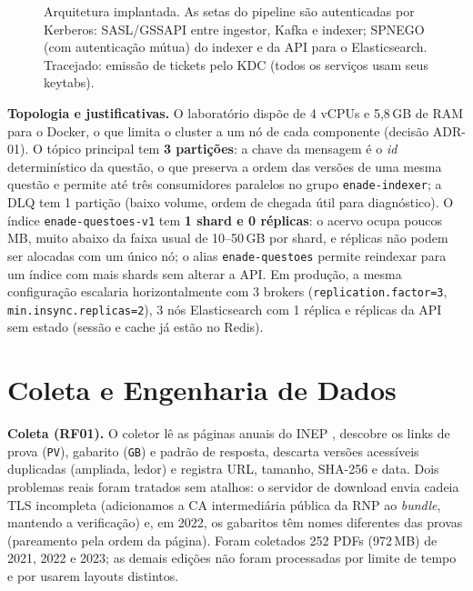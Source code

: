 \documentclass[12pt]{article}
\newcommand{\cod}[1]{\texttt{\small #1}}
\begin{document}
\begin{figure}[ht]
{}
\caption{Arquitetura implantada. As setas do pipeline são autenticadas por Kerberos: SASL/GSSAPI entre ingestor, Kafka e indexer; SPNEGO (com autenticação mútua) do indexer e da API para o Elasticsearch. Tracejado: emissão de tickets pelo KDC (todos os serviços usam seus keytabs).}
\label{fig:arq}
\end{figure}

\textbf{Topologia e justificativas.} O laboratório dispõe de 4 vCPUs e 5,8\,GB de RAM para o Docker, o que
limita o cluster a um nó de cada componente (decisão ADR-01). O tópico principal tem \textbf{3 partições}: a
chave da mensagem é o \textit{id} determinístico da questão, o que preserva a ordem das versões de uma mesma
questão e permite até três consumidores paralelos no grupo \cod{enade-indexer}; a DLQ tem 1 partição (baixo
volume, ordem de chegada útil para diagnóstico). O índice \cod{enade-questoes-v1} tem \textbf{1 shard e 0
réplicas}: o acervo ocupa poucos MB, muito abaixo da faixa usual de 10--50\,GB por shard, e réplicas não podem
ser alocadas com um único nó; o alias \cod{enade-questoes} permite reindexar para um índice com mais shards
sem alterar a API. Em produção, a mesma configuração escalaria horizontalmente com 3 brokers
(\cod{replication.factor=3}, \cod{min.insync.replicas=2}), 3 nós Elasticsearch com 1 réplica e réplicas da
API sem estado (sessão e cache já estão no Redis).

\section{Coleta e Engenharia de Dados}\label{sec:coleta}

\textbf{Coleta (RF01).} O coletor lê as páginas anuais do INEP \cite{inepprovas}, descobre os links de prova
(\cod{PV}), gabarito (\cod{GB}) e padrão de resposta, descarta versões acessíveis duplicadas (ampliada, ledor)
e registra URL, tamanho, SHA-256 e data. Dois problemas reais foram tratados sem atalhos: o servidor de
download envia cadeia TLS incompleta (adicionamos a CA intermediária pública da RNP ao \textit{bundle}, mantendo
a verificação) e, em 2022, os gabaritos têm nomes diferentes das provas (pareamento pela ordem da página). Foram
coletados 252 PDFs (972\,MB) de 2021, 2022 e 2023; as demais edições não foram processadas por limite de tempo e
por usarem layouts distintos.
\end{document}
